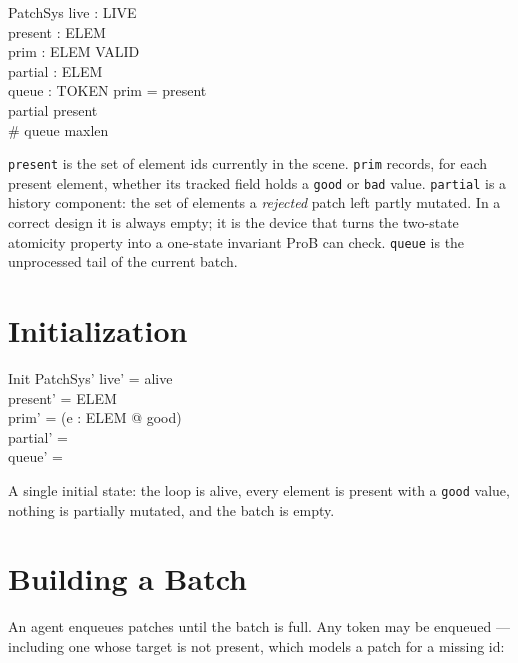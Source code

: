 \documentclass[a4paper,10pt,fleqn]{article}
\begin{document}
\begin{schema}{PatchSys}
  live : LIVE \\
  present : \power ELEM \\
  prim : ELEM \pfun VALID \\
  partial : \power ELEM \\
  queue : \seq TOKEN
\where
  \dom prim = present \\
  partial \subseteq present \\
  \# queue \leq maxlen
\end{schema}

\texttt{present} is the set of element ids currently in the scene.
\texttt{prim} records, for each present element, whether its tracked field
holds a \texttt{good} or \texttt{bad} value.  \texttt{partial} is a
history component: the set of elements a \emph{rejected} patch left partly
mutated.  In a correct design it is always empty; it is the device that
turns the two-state atomicity property into a one-state invariant ProB can
check.  \texttt{queue} is the unprocessed tail of the current batch.

\section{Initialization}

\begin{schema}{Init}
  PatchSys'
\where
  live' = alive \\
  present' = ELEM \\
  prim' = (\lambda e : ELEM @ good) \\
  partial' = \emptyset \\
  queue' = \langle \rangle
\end{schema}

A single initial state: the loop is alive, every element is present with a
\texttt{good} value, nothing is partially mutated, and the batch is empty.

\section{Building a Batch}

An agent enqueues patches until the batch is full.  Any token may be
enqueued --- including one whose target is not present, which models a
patch for a missing id:
\end{document}
